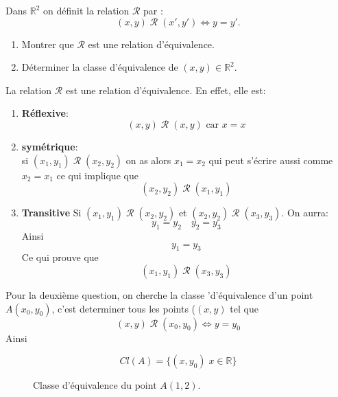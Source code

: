 \documentclass{report}
\begin{document}
\qs{}
{

  Dans $\mathbb{R}^2$ on d\'efinit la relation $\mathcal{R}$ par :
$$(x,y)\;\mathcal{R}\;(x',y')\iff y=y'.$$
\begin{enumerate}
    \item Montrer que $\mathcal{R}$ est une relation d'\'equivalence.
    \item D\'eterminer la classe d'\'equivalence de $(x,y)\in \mathbb{R}^2$.
\end{enumerate}
}
\begin{myproof}
  La relation $\mathcal{R}$ est une relation d'équivalence. En effet, elle est:

  \begin{enumerate}
    \item \textbf{Réflexive}:\\
      $$
      (x,y)\;\mathcal{R}\;(x,y) \text{ car } x = x
      $$
    \item \textbf{symétrique}:\\
      si $ (x_1,y_1)\;\mathcal{R}\; (x_2,y_2)$ on as alors $x_1 = x_2$ qui peut
      s'écrire aussi comme $x_2 = x_1$ ce qui implique que 
      $$
       (x_2, y_2) \;\mathcal{R}\; (x_1, y_1)
      $$
    \item \textbf{Transitive} 
      Si $(x_1, y_1) \;\mathcal{R}\;(x_2,y_2)$ et $(x_2, y_2)
      \;\mathcal{R}\;(x_3,y_3)$. On aurra:
      $$
      y_1 = y_2 \quad y_2 = y_3
      $$
      Ainsi 
      $$
      y_1 = y_3
      $$
      Ce qui prouve que 
      $$
(x_1, y_1) \;\mathcal{R}\;(x_3,y_3)
      $$
  \end{enumerate}

  Pour la deuxième question, on cherche la classe 'd'équivalence d'un point
  $A(x_0, y_0)$, c'est determiner tous les points ($(x,y)$ tel que
  $$
  (x,y) \;\mathcal{R}\; (x_0, y_0) \iff y = y_0
  $$
  Ainsi

  $$
  Cl(A) = \{ (x,y_0) \; x \in \mathbb{R}\}
  $$
  \begin{figure}[htpb]
  \begin{center}
  \end{center}
  \caption{ Classe d'équivalence du point $A(1,2)$.}%
  \end{figure}
\end{myproof}
\end{document}
